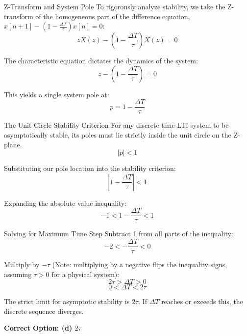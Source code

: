 \documentclass{beamer}
\begin{document}
\begin{frame}{Z-Transform and System Pole}
    To rigorously analyze stability, we take the Z-transform of the homogeneous part of the difference equation, $x[n+1] - \left(1 - \frac{\Delta T}{\tau}\right) x[n] = 0$:
    \begin{equation}
        z X(z) - \left(1 - \frac{\Delta T}{\tau}\right) X(z) = 0
    \end{equation}
    
    The characteristic equation dictates the dynamics of the system:
    \begin{equation}
        z - \left(1 - \frac{\Delta T}{\tau}\right) = 0
    \end{equation}
    
    This yields a single system pole at:
    \begin{equation}
        p = 1 - \frac{\Delta T}{\tau}
    \end{equation}
\end{frame}

\begin{frame}{The Unit Circle Stability Criterion}
    For any discrete-time LTI system to be asymptotically stable, its poles must lie strictly inside the unit circle on the Z-plane.
    \begin{equation}
        |p| < 1
    \end{equation}
    
    Substituting our pole location into the stability criterion:
    \begin{equation}
        \left| 1 - \frac{\Delta T}{\tau} \right| < 1
    \end{equation}
    
    Expanding the absolute value inequality:
    \begin{equation}
        -1 < 1 - \frac{\Delta T}{\tau} < 1
    \end{equation}
\end{frame}

\begin{frame}{Solving for Maximum Time Step}
    Subtract 1 from all parts of the inequality:
    \begin{equation}
        -2 < -\frac{\Delta T}{\tau} < 0
    \end{equation}
    
    Multiply by $-\tau$ (Note: multiplying by a negative flips the inequality signs, assuming $\tau > 0$ for a physical system):
    \begin{equation}
        2\tau > \Delta T > 0
    \end{equation}
    \begin{equation}
        0 < \Delta T < 2\tau
    \end{equation}
    
    The strict limit for asymptotic stability is $2\tau$. If $\Delta T$ reaches or exceeds this, the discrete sequence diverges.
    
    \vspace{0.5cm}
    \textbf{Correct Option: (d) $2\tau$}
\end{frame}
\end{document}

